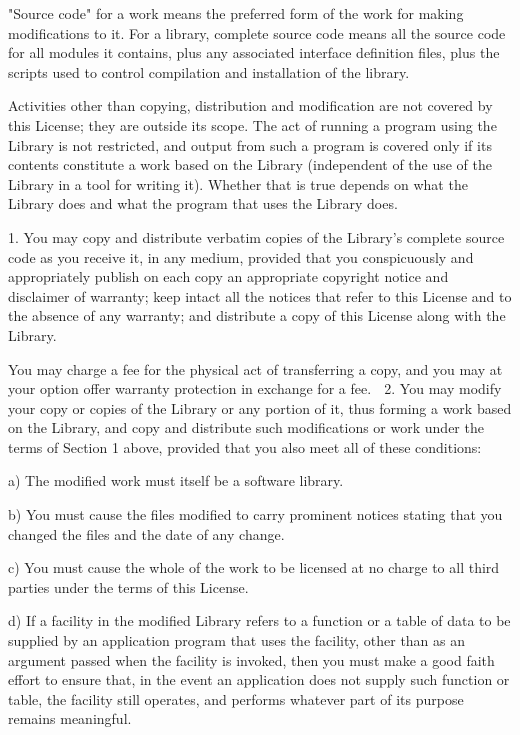 \documentclass[a4paper,twoside,12pt]{book}
\begin{document}
  "Source code" for a work means the preferred form of the work for
making modifications to it.  For a library, complete source code means
all the source code for all modules it contains, plus any associated
interface definition files, plus the scripts used to control compilation
and installation of the library.

  Activities other than copying, distribution and modification are not
covered by this License; they are outside its scope.  The act of
running a program using the Library is not restricted, and output from
such a program is covered only if its contents constitute a work based
on the Library (independent of the use of the Library in a tool for
writing it).  Whether that is true depends on what the Library does
and what the program that uses the Library does.

  1. You may copy and distribute verbatim copies of the Library's
complete source code as you receive it, in any medium, provided that
you conspicuously and appropriately publish on each copy an
appropriate copyright notice and disclaimer of warranty; keep intact
all the notices that refer to this License and to the absence of any
warranty; and distribute a copy of this License along with the
Library.

  You may charge a fee for the physical act of transferring a copy,
and you may at your option offer warranty protection in exchange for a
fee.

  2. You may modify your copy or copies of the Library or any portion
of it, thus forming a work based on the Library, and copy and
distribute such modifications or work under the terms of Section 1
above, provided that you also meet all of these conditions:

    a) The modified work must itself be a software library.

    b) You must cause the files modified to carry prominent notices
    stating that you changed the files and the date of any change.

    c) You must cause the whole of the work to be licensed at no
    charge to all third parties under the terms of this License.

    d) If a facility in the modified Library refers to a function or a
    table of data to be supplied by an application program that uses
    the facility, other than as an argument passed when the facility
    is invoked, then you must make a good faith effort to ensure that,
    in the event an application does not supply such function or
    table, the facility still operates, and performs whatever part of
    its purpose remains meaningful.
\end{document}
